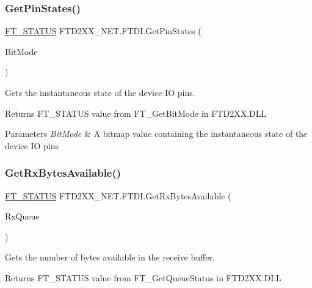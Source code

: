 \subsubsection{\texorpdfstring{GetPinStates()}{GetPinStates()}}
{\footnotesize\ttfamily \mbox{\hyperlink{class_f_t_d2_x_x___n_e_t_1_1_f_t_d_i_aabe20ad905cc4ccc1e35dd5b877d9a83}{F\+T\+\_\+\+S\+T\+A\+T\+US}} F\+T\+D2\+X\+X\+\_\+\+N\+E\+T.\+F\+T\+D\+I.\+Get\+Pin\+States (\begin{DoxyParamCaption}\item[{ref byte}]{Bit\+Mode }\end{DoxyParamCaption})}



Gets the instantaneous state of the device IO pins. 

\begin{DoxyReturn}{Returns}
F\+T\+\_\+\+S\+T\+A\+T\+US value from F\+T\+\_\+\+Get\+Bit\+Mode in F\+T\+D2\+X\+X.\+D\+LL
\end{DoxyReturn}

\begin{DoxyParams}{Parameters}
{\em Bit\+Mode} & A bitmap value containing the instantaneous state of the device IO pins\\
\hline
\end{DoxyParams}
\mbox{\label{class_f_t_d2_x_x___n_e_t_1_1_f_t_d_i_a5539d6cb1f768374a67294758b346f45}} 
\subsubsection{\texorpdfstring{GetRxBytesAvailable()}{GetRxBytesAvailable()}}
{\footnotesize\ttfamily \mbox{\hyperlink{class_f_t_d2_x_x___n_e_t_1_1_f_t_d_i_aabe20ad905cc4ccc1e35dd5b877d9a83}{F\+T\+\_\+\+S\+T\+A\+T\+US}} F\+T\+D2\+X\+X\+\_\+\+N\+E\+T.\+F\+T\+D\+I.\+Get\+Rx\+Bytes\+Available (\begin{DoxyParamCaption}\item[{ref U\+Int32}]{Rx\+Queue }\end{DoxyParamCaption})}



Gets the number of bytes available in the receive buffer. 

\begin{DoxyReturn}{Returns}
F\+T\+\_\+\+S\+T\+A\+T\+US value from F\+T\+\_\+\+Get\+Queue\+Status in F\+T\+D2\+X\+X.\+D\+LL
\end{DoxyReturn}


